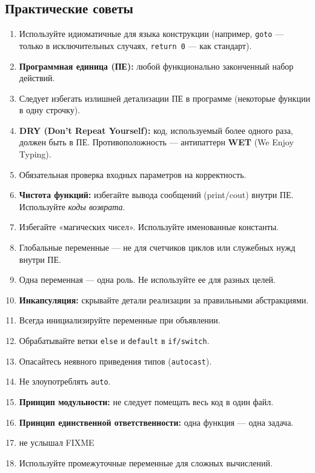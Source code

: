 \documentclass[a4paper, 12pt]{article}
\newcommand{\term}[1]{\textbf{#1}} %
\newcommand{\code}[1]{\texttt{#1}} %
\begin{document}
\subsection*{Практические советы}
\begin{enumerate}
    \item Используйте идиоматичные для языка конструкции (например, \code{goto} — только в исключительных случаях, \code{return 0} — как стандарт).
    \item \term{Программная единица (ПЕ):} любой функционально законченный набор действий.
    \item Следует избегать излишней детализации ПЕ в программе (некоторые функции в одну строчку).
    \item \term{DRY (Don't Repeat Yourself):} код, используемый более одного раза, должен быть в ПЕ. Противоположность — антипаттерн \term{WET} (We Enjoy Typing).
    \item Обязательная проверка входных параметров на корректность.
    \item \term{Чистота функций:} избегайте вывода сообщений (print/cout) внутри ПЕ. Используйте \textit{коды возврата}.
    \item Избегайте «магических чисел». Используйте именованные константы.
    \item Глобальные переменные — не для счетчиков циклов или служебных нужд внутри ПЕ.
    \item Одна переменная — одна роль. Не используйте ее для разных целей.
    \item \term{Инкапсуляция:} скрывайте детали реализации за правильными абстракциями.
    \item Всегда инициализируйте переменные при объявлении.
    \item Обрабатывайте ветки \code{else} и \code{default} в \code{if/switch}.
    \item Опасайтесь неявного приведения типов (\code{autocast}).
    \item Не злоупотреблять \code{auto}.
    \item \term{Принцип модульности:} не следует помещать весь код в один файл.
    \item \term{Принцип единственной ответственности:} одна функция — одна задача.
    \item не услышал FIXME
    \item Используйте промежуточные переменные для сложных вычислений.
\end{enumerate}

\newpage
\end{document}
